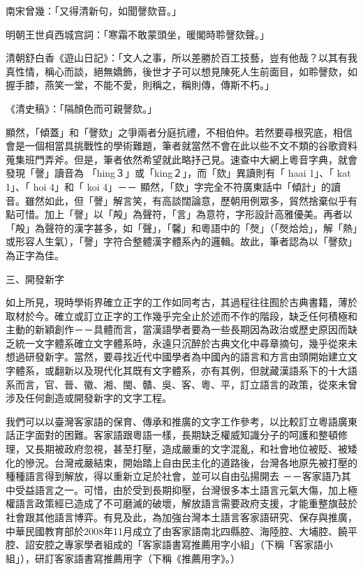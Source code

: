 \documentclass[a5paper, 10pt, openany]{book} %
\begin{document}
南宋曾幾：「又得清新句，如聞謦欬音。」

明朝王世貞西城宫詞：「寒霜不敢蒙頭坐，暖閣時聆謦欬聲。」

清朝舒白香《遊山日記》：「文人之事，所以差勝於百工技藝，豈有他哉？以其有我真性情，稱心而談，絕無嬌飾，後世才子可以想見陳死人生前面目，如聆謦欬，如握手膝，燕笑一堂，不能不愛，則稱之，稱則傳，傳斯不朽。」

《清史稿》：「隔顏色而可親謦欬。」

顯然，「傾蓋」和「謦欬」之爭兩者分庭抗禮，不相伯仲。若然要尋根究底，相信會是一個相當具挑戰性的學術難題，筆者就當然不會在此以些不文不類的谷歌資料蒐集班門弄斧。但是，筆者依然希望就此略抒己見。速查中大網上粵音字典，就會發現「謦」讀音為 「hing３」或「king２」，而「欬」異讀則有「 haai 1」、「 kat 1」、「 hoi 4」和「 koi 4」－－ 顯然，「欬」字完全不符廣東話中「傾計」的讀音。雖然如此，但「謦」解言笑，有高談闊論意，歷朝用例眾多，貿然捨棄似乎有點可惜。加上「謦」以「殸」為聲符，「言」為意符，字形設計高雅優美。再者以「殸」為聲符的漢字甚多，如「聲」，「馨」和粵語中的「㷫」（「㷫烚烚」，解「熱」或形容人生氣），「謦」字符合整體漢字體系內的邏輯。故此，筆者認為以「謦欬」為正字為佳。

三、開發新字

如上所見，現時學術界確立正字的工作如同考古，其過程往往囿於古典書籍，薄於取材於今。確立或訂立正字的工作幾乎完全止於述而不作的階段，缺乏任何積極和主動的新穎創作－－具體而言，當漢語學者要為一些長期因為政治或歷史原因而缺乏統一文字體系確立文字體系時，永遠只沉醉於古典文化中尋章摘句，幾乎從來未想過研發新字。當然，要尋找近代中國學者為中國內的語言和方言由頭開始建立文字體系，或翻新以及現代化其既有文字體系，亦有其例，但就藏漢語系下的十大語系而言，官、晉、徽、湘、閩、贛、吳、客、粵、平，訂立語言的政策，從來未曾涉及任何創造或開發新字的文字工程。

我們可以以臺灣客家語的保育、傳承和推廣的文字工作參考，以比較訂立粵語廣東話正字面對的困難。客家語跟粵語一樣，長期缺乏權威知識分子的呵護和整頓修理，又長期被政府忽視，甚至打壓，造成嚴重的文字混亂，和社會地位被貶、被矮化的慘況。台灣戒嚴結束，開始踏上自由民主化的道路後，台灣各地原先被打壓的種種語言得到解放，得以重新立足於社會，並可以自由弘揚開去 －－客家語乃其中受益語言之一。可惜，由於受到長期抑壓，台灣很多本土語言元氣大傷，加上極權語言政策經已造成了不可磨滅的破壞，解放語言需要政府支援，才能重整旗鼓於社會跟其他語言博弈。有見及此，為加強台灣本土語言客家語研究、保存與推廣，中華民國教育部於2008年11月成立了由客家語南北四縣腔、海陸腔、大埔腔、饒平腔、詔安腔之專家學者組成的「客家語書寫推薦用字小組」（下稱「客家語小組」），研訂客家語書寫推薦用字（下稱《推薦用字》。）
\end{document}
